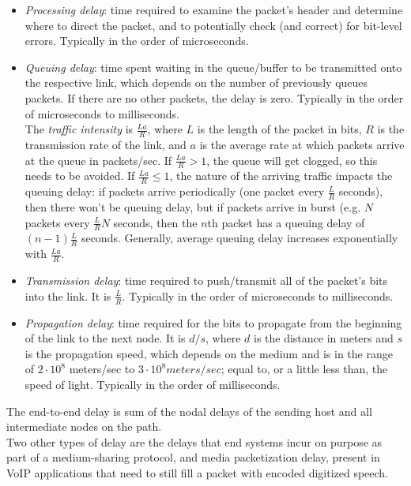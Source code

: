 \documentclass[8pt, table, xcdraw]{article}%
\begin{document}
\begin{itemize}
    \item \emph{Processing delay}: time required to examine the packet’s header and determine where to direct the packet, and to potentially check (and correct) for bit-level errors. Typically in the order of microseconds.
    \item \emph{Queuing delay}: time spent waiting in the queue/buffer to be transmitted onto the respective link, which depends on the number of previously queues packets. If there are no other packets, the delay is zero. Typically in the order of microseconds to milliseconds.\\
    The \emph{traffic intensity} is $\frac{La}{R}$, where $L$ is the length of the packet in bits, $R$ is the transmission rate of the link, and $a$ is the average rate at which packets arrive at the queue in packets/sec. If $\frac{La}{R} > 1$, the queue will get clogged, so this needs to be avoided. If $\frac{La}{R} \leq 1$, the nature of the arriving traffic impacts the queuing delay: if packets arrive periodically (one packet every $\frac{L}{R}$ seconds), then there won't be queuing delay, but if packets arrive in burst (e.g. $N$ packets every $\frac{L}{R}N$ seconds, then the $n$th packet has a queuing delay of $(n - 1)\frac{L}{R}$ seconds. Generally, average queuing delay increases exponentially with $\frac{La}{R}$.
    \item \emph{Transmission delay}: time required to push/transmit all of the packet’s bits into the link. It is $\frac{L}{R}$. Typically in the order of microseconds to milliseconds.
    \item \emph{Propagation delay}: time required for the bits to propagate from the beginning of the link to the next node. It is $d/s$, where $d$ is the distance in meters and $s$ is the propagation speed, which depends on the medium and is in the range of $2 \cdot 10^8$ meters/sec to $3 \cdot 10^8 meters/sec$; equal to, or a little less than, the speed of light. Typically in the order of milliseconds.
\end{itemize}

The end-to-end delay is sum of the nodal delays of the sending host and all intermediate nodes on the path.\\
Two other types of delay are the delays that end systems incur on purpose as part of a medium-sharing protocol, and media packetization delay, present in VoIP applications that need to still fill a packet with encoded digitized speech.
\end{document}
